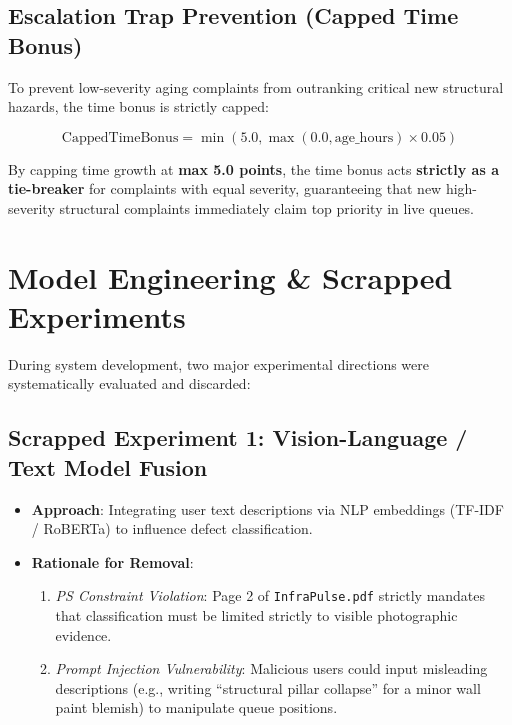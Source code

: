 \documentclass[11pt,a4paper]{article}
\begin{document}
\subsection{Escalation Trap Prevention (Capped Time Bonus)}
To prevent low-severity aging complaints from outranking critical new structural hazards, the time bonus is strictly capped:

\begin{equation}
\text{CappedTimeBonus} = \min\left(5.0, \max(0.0, \text{age\_hours}) \times 0.05\right)
\end{equation}

By capping time growth at \textbf{max 5.0 points}, the time bonus acts \textbf{strictly as a tie-breaker} for complaints with equal severity, guaranteeing that new high-severity structural complaints immediately claim top priority in live queues.

\section{Model Engineering \& Scrapped Experiments}

During system development, two major experimental directions were systematically evaluated and discarded:

\subsection{Scrapped Experiment 1: Vision-Language / Text Model Fusion}
\begin{itemize}
    \item \textbf{Approach}: Integrating user text descriptions via NLP embeddings (TF-IDF / RoBERTa) to influence defect classification.
    \item \textbf{Rationale for Removal}:
    \begin{enumerate}
        \item \textit{PS Constraint Violation}: Page 2 of \texttt{InfraPulse.pdf} strictly mandates that classification must be limited strictly to visible photographic evidence.
        \item \textit{Prompt Injection Vulnerability}: Malicious users could input misleading descriptions (e.g., writing ``structural pillar collapse'' for a minor wall paint blemish) to manipulate queue positions.
    \end{enumerate}
\end{itemize}
\end{document}

